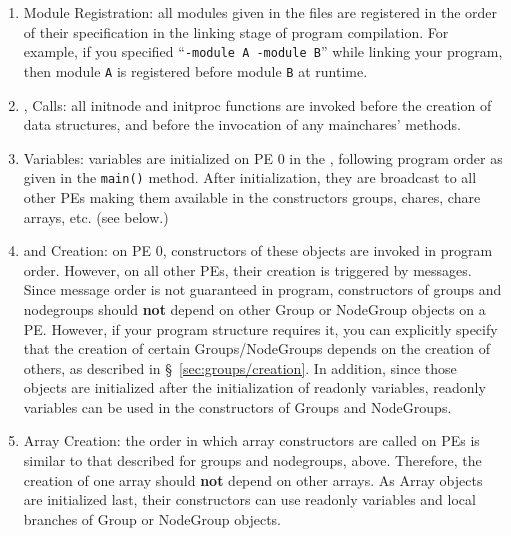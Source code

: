 \begin{enumerate}
\item Module Registration: all modules given in the  files are registered in the order
of their specification in the linking stage of program compilation.
For example, if you specified ``{\tt -module A -module B}'' while linking your \charmpp{} program,
then module {\tt A} is registered before module {\tt B} at runtime.

\item {},  Calls: all initnode and initproc functions are invoked before the
creation of \charmpp{} data structures, and before the invocation of any
mainchares'  methods.

\item {} Variables:  variables are initialized on PE 0 in the ,
following program order as given in the {\tt main()} method. After initialization, they
are broadcast to all other PEs making them available in the constructors
groups, chares, chare arrays, etc. (see below.)

\item {} and  Creation: on PE 0, constructors of these
objects are invoked in program order. However, on all other PEs, their
creation is triggered by messages. Since message order is not guaranteed
in \charmpp{} program, constructors of groups and nodegroups should \textbf{not} depend 
on other Group or NodeGroup objects on a PE. However, if your program structure requires
it, you can explicitly specify that the creation of certain Groups/NodeGroups depends
on the creation of others, as described in \S~\ref{sec:groups/creation}.
In addition, since those objects are initialized
after the initialization of readonly variables, readonly variables can be used
in the constructors of Groups and NodeGroups.

\item \charmpp{} Array Creation: the order in which array constructors are called on PEs is
similar to that described for groups and nodegroups, above.
Therefore, the creation of one array should \textbf{not} depend on other arrays.
As Array objects are initialized last, their constructors can use 
readonly variables and local branches of Group or NodeGroup objects.
\end{enumerate}
